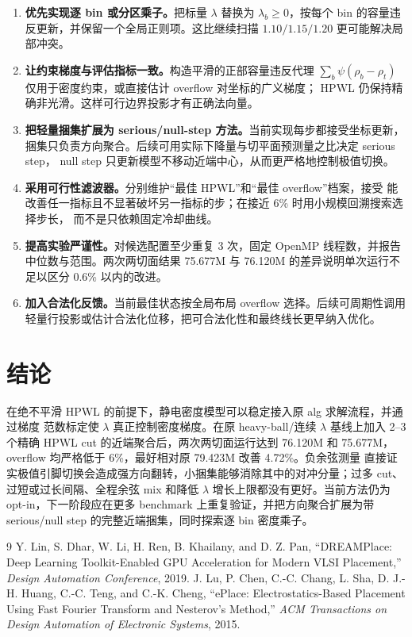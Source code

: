 \documentclass[UTF8,fontset=windows,a4paper,11pt]{ctexart}
\begin{document}
\begin{enumerate}
  \item \textbf{优先实现逐 bin 或分区乘子。}把标量 $\lambda$ 替换为
  $\lambda_b\geq0$，按每个 bin 的容量违反更新，并保留一个全局正则项。这比继续扫描
  $1.10/1.15/1.20$ 更可能解决局部冲突。
  \item \textbf{让约束梯度与评估指标一致。}构造平滑的正部容量违反代理
  $\sum_b\psi(\rho_b-\rho_t)$ 仅用于密度约束，或直接估计 overflow 对坐标的广义梯度；
  HPWL 仍保持精确非光滑。这样可行边界投影才有正确法向量。
  \item \textbf{把轻量捆集扩展为 serious/null-step 方法。}当前实现每步都接受坐标更新，
  捆集只负责方向聚合。后续可用实际下降量与切平面预测量之比决定 serious step，
  null step 只更新模型不移动近端中心，从而更严格地控制极值切换。
  \item \textbf{采用可行性滤波器。}分别维护``最佳 HPWL''和``最佳 overflow''档案，接受
  能改善任一指标且不显著破坏另一指标的步；在接近 6\% 时用小规模回溯搜索选择步长，
  而不是只依赖固定冷却曲线。
  \item \textbf{提高实验严谨性。}对候选配置至少重复 3 次，固定 OpenMP 线程数，并报告
  中位数与范围。两次两切面结果 75.677M 与 76.120M 的差异说明单次运行不足以区分
  0.6\% 以内的改进。
  \item \textbf{加入合法化反馈。}当前最佳状态按全局布局 overflow 选择。后续可周期性调用
  轻量行投影或估计合法化位移，把可合法化性和最终线长更早纳入优化。
\end{enumerate}

\section{结论}

在绝不平滑 HPWL 的前提下，静电密度模型可以稳定接入原 alg 求解流程，并通过梯度
范数标定使 $\lambda$ 真正控制密度梯度。在原 heavy-ball/连续 $\lambda$ 基线上加入
2--3 个精确 HPWL cut 的近端聚合后，两次两切面运行达到 76.120M 和
75.677M，overflow 均严格低于 6\%，最好相对原 79.423M 改善 4.72\%。负余弦测量
直接证实极值引脚切换会造成强方向翻转，小捆集能够消除其中的对冲分量；过多 cut、
过短或过长间隔、全程余弦 mix 和降低 $\lambda$ 增长上限都没有更好。当前方法仍为
opt-in，下一阶段应在更多 benchmark 上重复验证，并把方向聚合扩展为带 serious/null
step 的完整近端捆集，同时探索逐 bin 密度乘子。

\begin{thebibliography}{9}
Y. Lin, S. Dhar, W. Li, H. Ren, B. Khailany, and D. Z. Pan,
``DREAMPlace: Deep Learning Toolkit-Enabled GPU Acceleration for Modern VLSI Placement,''
\textit{Design Automation Conference}, 2019.
J. Lu, P. Chen, C.-C. Chang, L. Sha, D. J.-H. Huang, C.-C. Teng, and C.-K. Cheng,
``ePlace: Electrostatics-Based Placement Using Fast Fourier Transform and Nesterov's Method,''
\textit{ACM Transactions on Design Automation of Electronic Systems}, 2015.
\end{thebibliography}
\end{document}
